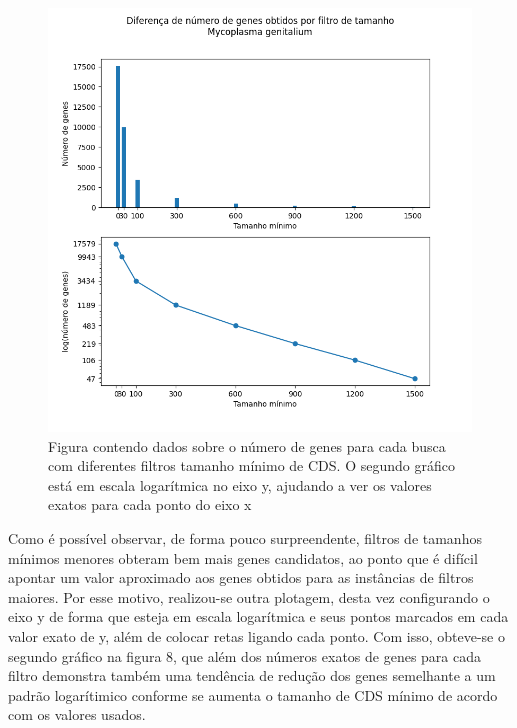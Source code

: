 \documentclass[brazilian,12pt,a4paper,final]{article}
\begin{document}
	\begin{figure}[hbtp]
		\begin{center}
			\includegraphics[width=15cm]{../Figures/FiltroTamanho.png}
			\caption{Figura contendo dados sobre o número de genes para cada busca com diferentes filtros tamanho mínimo de CDS. O segundo gráfico está em escala logarítmica no eixo y, ajudando a ver os valores exatos para cada ponto do eixo x}
			\label{fig}
		\end{center}
	\end{figure}
	
	
	 \vspace{0.5cm}
	
	Como é possível observar, de forma pouco surpreendente, filtros de tamanhos mínimos menores obteram bem mais genes candidatos, ao ponto que é difícil apontar um valor aproximado aos genes obtidos para as instâncias de filtros maiores. Por esse motivo, realizou-se outra plotagem, desta vez configurando o eixo y de forma que esteja em escala logarítmica e seus pontos marcados em cada valor exato de y, além de colocar retas ligando cada ponto. Com isso, obteve-se o segundo gráfico na figura 8, que além dos números exatos de genes para cada filtro demonstra também uma tendência de redução dos genes semelhante a um padrão logarítimico conforme se aumenta o tamanho de CDS mínimo de acordo com os valores usados.
	
\end{document}
